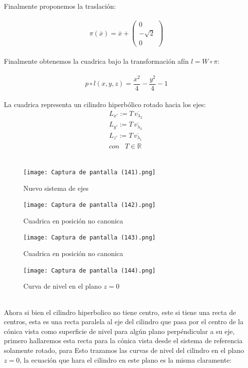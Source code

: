 \documentclass[11pt,letterpaper]{article}
\newcommand{\R}{\mathbb{R}}
\begin{document}
    Finalmente proponemos la traslaci\'on:\,\\
    \,\\
    \begin{equation*}
        \pi(\overline{x})=\overline{x}+
        \begin{pmatrix}
                0\\
                -\sqrt{2}\\
                0
                \end{pmatrix}
    \end{equation*}\,\\
    Finalmente obtenemos la cuadrica bajo la transformaci\'on af\'in $l=W\circ \pi $:\,\\
    \,\\
    \begin{equation*}
        p\circ l(x,y,z)=\frac{x^2}{4}-\frac{y^2}{4}-1
    \end{equation*}\,\\
    La cuadrica representa un cilindro hiperb\'olico rotado hacia los ejes:
     \begin{align*}
        L_{x'}:=T\,\overline{v_{\lambda_2}}\,\\
        L_{y'}:=T\,\overline{v_{\lambda_3}}\,\\
        L_{z'}:=T\,\overline{v_{\lambda_1}}\,\\
        con\,\,\,\,\,T\in \R
    \end{align*}\,\\
    \begin{figure}[htb]
    \centering
    \texttt{[image: Captura de pantalla (141).png]}
    \caption{Nuevo sistema de ejes}
    \label{Cono rebanado}
     \end{figure}
       \begin{figure}[htb]
    \centering
    \texttt{[image: Captura de pantalla (142).png]}
    \caption{Cuadrica en posici\'on no canonica}
    \label{Cono rebanado}
     \end{figure}
       \begin{figure}[htb]
    \centering
    \texttt{[image: Captura de pantalla (143).png]}
    \caption{Cuadrica en posici\'on no canonica}
    \label{Cono rebanado}
    
    \end{figure}
    \begin{figure}
        \centering
    \texttt{[image: Captura de pantalla (144).png]}
    \caption{Curva de nivel en el plano $z=0$} 
    \end{figure}
    \newpage
   \,\\
     Ahora si bien el cilindro hiperbolico no tiene centro, este si tiene una recta de centros, esta es
     una recta paralela al eje del cilindro que pasa por el centro de la c\'onica vista como superficie de nivel para alg\'un plano perp\'endicular a su eje,
     primero hallaremos esta recta para la c\'onica vista desde el sistema de referencia solamente rotado, para Esto
     trazamos las curvas de nivel del cilindro en el plano $z=0$, la ecuaci\'on que hara el cilindro en este plano es la misma claramente:\,\\
     \,\\
     
\end{document}

